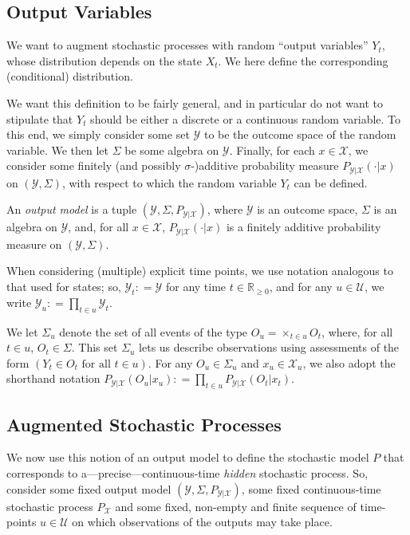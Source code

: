 \documentclass[twoside,11pt]{article}
\newcommand{\reals}{\mathbb{R}}
\newcommand{\realsnonneg}{\reals_{\geq 0}}
\newcommand{\states}{\mathcal{X}}
\newcommand{\observs}{\mathcal{Y}}
\newcommand{\coloneqq}{:\!=}
\begin{document}
\subsection{Output Variables}\label{sec:observs}

We want to augment stochastic processes with random ``output variables'' $Y_t$, whose distribution depends on the state $X_t$. We here define the corresponding (conditional) distribution.

We want this definition to be fairly general, and in particular do not want to stipulate that $Y_t$ should be either a discrete or a continuous random variable. To this end, we simply consider some set $\observs$ to be the outcome space of the random variable. We then let $\Sigma$ be some algebra on $\observs$. Finally, for each $x\in\states$, we consider some finitely (and possibly $\sigma$-)additive probability measure $P_{\observs\vert\states}(\cdot\vert x)$ on $(\observs,\Sigma)$, with respect to which the random variable $Y_t$ can be defined.

\begin{definition}
An \emph{output model} is a tuple $(\observs,\Sigma,P_{\observs\vert \states})$, where $\observs$ is an outcome space, $\Sigma$ is an algebra on $\observs$, and, for all $x\in\states$, $P_{\observs\vert\states}(\cdot\vert x)$ is a finitely additive probability measure on $(\observs,\Sigma)$.
\end{definition}

When considering (multiple) explicit time points, we use notation analogous to that used for states; so, $\observs_t\coloneqq\observs$ for any time $t\in\realsnonneg$, and for any $u\in\mathcal{U}$, we write $\observs_u\coloneqq \prod_{t\in u}\observs_{t}$. 

We let $\Sigma_u$ denote the set of all events of the type $O_u=\times_{t\in u}O_t$, where, for all $t\in u$, $O_{t}\in\Sigma$. 
This set $\Sigma_u$ lets us describe observations using assessments of the form $(Y_t\in O_t \text{~for all $t\in u$})$.   
For any $O_u\in\Sigma_u$ and $x_u\in\states_u$, we also adopt the shorthand notation $P_{\observs\vert\states}(O_u\vert x_u)\coloneqq \prod_{t\in u}P_{\observs\vert\states}(O_t\vert x_t)$.
\vspace{-4pt}

\subsection{Augmented Stochastic Processes}\label{sec:aug_stochastic_processes}
We now use this notion of an output model to define the stochastic model $P$ that corresponds to a---precise---continuous-time \emph{hidden} stochastic process. 
So, consider some fixed output model $(\observs,\Sigma,P_{\observs\vert\states})$, some fixed continuous-time stochastic process $P_\states$ and some fixed, non-empty and finite sequence of time-points $u\in\mathcal{U}$ on which observations of the outputs may take place. 
\end{document}
